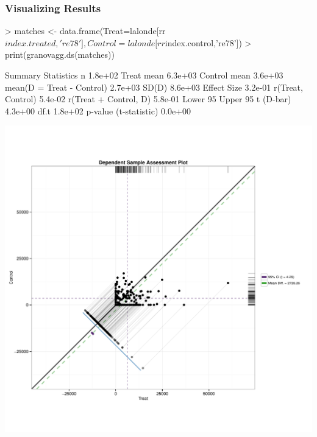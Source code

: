 \documentclass[10pt,slidestop,mathserif,c]{beamer}
\begin{document}
\begin{frame}
    \frametitle{Visualizing Results}
\begin{Schunk}
\begin{Sinput}
> matches <- data.frame(Treat=lalonde[rr$index.treated,'re78'], 
   Control=lalonde[rr$index.control,'re78'])
> print(granovagg.ds(matches))
\end{Sinput}
\begin{Soutput}
                              Summary Statistics
n                                        1.8e+02
Treat mean                               6.3e+03
Control mean                             3.6e+03
mean(D = Treat - Control)                2.7e+03
SD(D)                                    8.6e+03
Effect Size                              3.2e-01
r(Treat, Control)                        5.4e-02
r(Treat + Control, D)                    5.8e-01
Lower 95%
Upper 95%
t (D-bar)                                4.3e+00
df.t                                     1.8e+02
p-value (t-statistic)                    0.0e+00
\end{Soutput}
\end{Schunk}
\end{frame}

\begin{frame}
    \begin{center}
        \includegraphics{figures/Slides-granovaggds}
    \end{center}
\end{frame}
\end{document}
